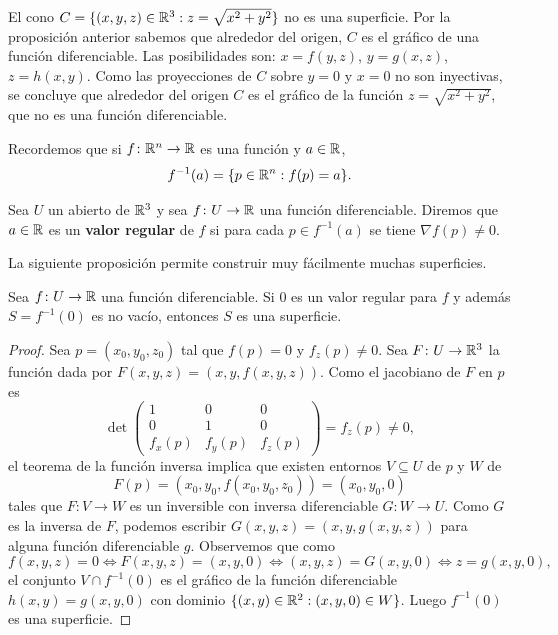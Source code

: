 \begin{example}
	El cono $C=\{(x,y,z)\in\mathbb{R}^3:z=\sqrt{x^2+y^2}\}$ no es una superficie. Por
	la proposición anterior sabemos que alrededor del origen, $C$ es el gráfico
	de una función diferenciable. Las posibilidades son: $x=f(y,z)$,
	$y=g(x,z)$, $z=h(x,y)$. Como las proyecciones de $C$ sobre $y=0$ y $x=0$ no
	son inyectivas, se concluye que alrededor del origen $C$ es el gráfico de
	la función $z=\sqrt{x^2+y^2}$, que no es una función diferenciable. 
\end{example}

Recordemos que si $f\colon\mathbb{R}^n\to\mathbb{R}$ es una función y $a\in\mathbb{R}$, 
\[
	f^{-1}(a)=\{p\in\mathbb{R}^n:f(p)=a\}.
\]

\begin{definition}
	Sea $U$ un abierto de $\mathbb{R}^3$ y sea $f\colon U\to\mathbb{R}$ una función
	diferenciable. Diremos que $a\in\mathbb{R}$ es un \textbf{valor regular} de $f$ si
	para cada $p\in f^{-1}(a)$ se tiene $\nabla f(p)\ne 0$.
\end{definition}

La siguiente proposición permite construir muy fácilmente muchas superficies.

\begin{proposition}
	\label{pro:regular}
	Sea $f\colon U\to\mathbb{R}$ una función diferenciable.  Si $0$ es un valor regular
	para $f$ y además $S=f^{-1}(0)$ es no vacío, entonces $S$ es una superficie.
\end{proposition}

\begin{proof}
	Sea $p=(x_0,y_0,z_0)$ tal que $f(p)=0$ y $f_z(p)\ne 0$. Sea $F\colon
	U\to\mathbb{R}^3$ la función dada por $F(x,y,z)=(x,y,f(x,y,z))$. Como el jacobiano
	de $F$ en $p$ es 
	\[
		\det\begin{pmatrix}
			1 & 0 & 0\\
			0 & 1 & 0\\
			f_x(p) & f_y(p) & f_z(p)
		\end{pmatrix}
		=f_z(p)\ne 0,
	\]
	el teorema de la función inversa implica que existen entornos $V\subseteq U$ de $p$ y
	$W$ de 
	\[
		F(p)=(x_0,y_0,f(x_0,y_0,z_0))=(x_0,y_0,0) 
	\]
	tales que $F\colon V\to W$ es un inversible con inversa diferenciable
	$G\colon W\to U$. Como $G$ es la inversa de $F$, podemos escribir $G(x,y,z)=(x,y,g(x,y,z))$ para alguna función diferenciable $g$. 
	Observemos que como 
	\[
		f(x,y,z)=0\Longleftrightarrow
		F(x,y,z)=(x,y,0)\Longleftrightarrow
		(x,y,z)=G(x,y,0)\Longleftrightarrow
		z=g(x,y,0),
	\]
	el conjunto $V\cap f^{-1}(0)$ es el gráfico de la función diferenciable
	$h(x,y)=g(x,y,0)$ con dominio $\{(x,y)\in\mathbb{R}^2:(x,y,0)\in W\}$. Luego
	$f^{-1}(0)$ es una superficie.
\end{proof}

